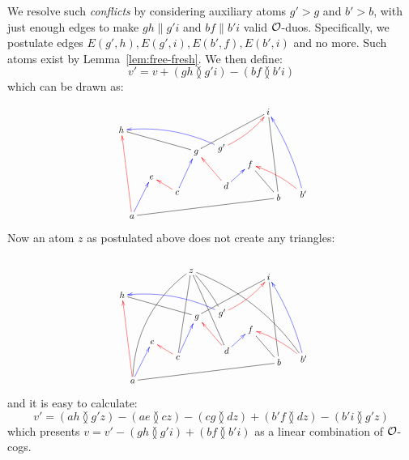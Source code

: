 We resolve such {\em conflicts} by considering auxiliary atoms $g'>g$ and $b'>b$, with just enough edges to make $gh\parallel g'i$ and $bf\parallel b'i$ valid ${\cal O}$-duos. 
Specifically, we postulate edges $E(g', h), E(g', i), E(b', f), E(b', i)$ and no more. 
Such atoms exist by Lemma~\ref{lem:free-fresh}. 
We then define:
\[
    v' = v + (gh \between g'i) - (bf \between b'i)
\]
which can be drawn as:
\[\scalebox{0.8}{
\rotatebox{7}{
    \xymatrix@R=6pt@C=15pt{
    \rotatebox{-7}{$h$} & & & & & & \rotatebox{-7}{$i$} \\
    \\
    & & & \rotatebox{-7}{$g$}\ar@{-}[uulll]\ar@{-}[uurrr] & \rotatebox{-7}{$g'$}\ar@[blue]@/_2ex/[uullll]\ar@[red]@/_1ex/[uurr] \\
    & \rotatebox{-7}{$e$} & & & & \rotatebox{-7}{$f$} \\
    & & \rotatebox{-7}{$c$}\ar@[red][ul]\ar@[blue][uur] & & \rotatebox{-7}{$d$}\ar@[red][uul]\ar@[blue][ur] \\
    \rotatebox{-7}{$a$}\ar@{-}[rrrrrr]\ar@[red][uuuuu]\ar@[blue][uur] & & & & & & \rotatebox{-7}{$b$}\ar@{-}[uul]\ar@{-}[uuuuu] & \rotatebox{-7}{$b'$}\ar@[red]@/_1ex/[uull]\ar@[blue]@/_1ex/[uuuuul]
    }
}
}\]
Now an atom $z$ as postulated above does not create any triangles:
\[\scalebox{0.8}{
\rotatebox{7}{
    \xymatrix@R=6pt@C=15pt{
    & & & \rotatebox{-7}{$z$}\ar@{-}@/_4ex/[llldddddd]\ar@{-}[lddddd]\ar@{-}[rddddd]\ar@{-}@/_-0.5ex/[rddd]\ar@{-}@/_-3ex/[rrrrdddddd] \\
    \rotatebox{-7}{$h$} & & & & & & \rotatebox{-7}{$i$} \\
    \\
    & & & \rotatebox{-7}{$g$}\ar@{-}[uulll]\ar@{-}[uurrr] & \rotatebox{-7}{$g'$}\ar@[blue]@/_2ex/[uullll]\ar@[red]@/_1ex/[uurr] \\
    & \rotatebox{-7}{$e$} & & & & \rotatebox{-7}{$f$} \\
    & & \rotatebox{-7}{$c$}\ar@[red][ul]\ar@[blue][uur] & & \rotatebox{-7}{$d$}\ar@[red][uul]\ar@[blue][ur] \\
    \rotatebox{-7}{$a$}\ar@{-}[rrrrrr]\ar@[red][uuuuu]\ar@[blue][uur] & & & & & & \rotatebox{-7}{$b$}\ar@{-}[uul]\ar@{-}[uuuuu] & \rotatebox{-7}{$b'$}\ar@[red]@/_1ex/[uull]\ar@[blue]@/_1ex/[uuuuul]
    }
}
}\]
and it is easy to calculate:
\[
v' = (ah \between g'z)  - (ae \between cz) - (cg \between dz) + (b'f \between dz) -(b'i \between g'z)
\]
which presents $v = v' - (gh \between g'i) + (bf \between b'i)$ as a linear combination of $\cal O$-cogs.



